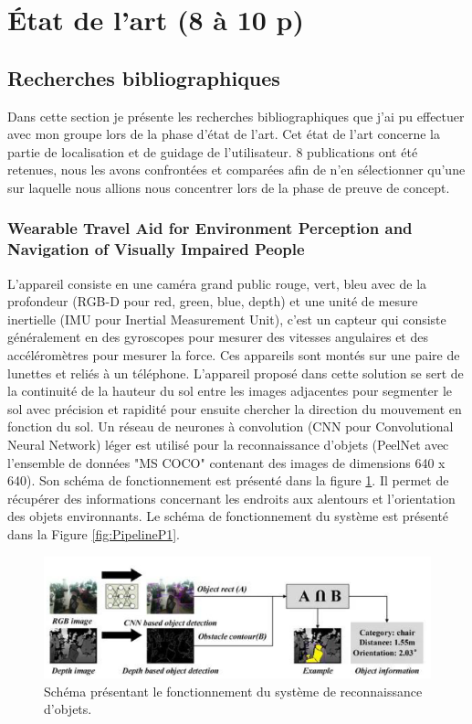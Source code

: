 \documentclass[11pt]{article}
\begin{document}
  \section{État de l'art (8 à 10 p)}  
  \subsection{Recherches bibliographiques}
  Dans cette section je présente les recherches bibliographiques que j'ai pu effectuer avec mon groupe lors de la phase d'état de l'art.
  Cet état de l'art concerne la partie de localisation et de guidage de l'utilisateur. 8 publications ont été retenues, nous les avons 
  confrontées et comparées afin de n'en sélectionner qu'une sur laquelle nous allions nous concentrer lors de la phase de preuve de 
  concept. 

  \subsubsection{Wearable Travel Aid for Environment Perception and Navigation of
  Visually Impaired People}

  L'appareil consiste en une caméra grand public rouge, vert, bleu avec de la profondeur (RGB-D pour red, green, blue, depth)
  et une unité de mesure inertielle (IMU pour Inertial Measurement Unit), c'est un capteur qui consiste généralement en des gyroscopes 
  pour mesurer des vitesses angulaires et des accéléromètres pour mesurer la force. Ces appareils sont montés sur une paire de lunettes
  et reliés à un téléphone. L'appareil proposé dans cette solution se sert de la continuité de la hauteur du sol entre les images 
  adjacentes pour segmenter le sol avec précision et rapidité pour ensuite chercher la direction du mouvement en fonction du sol.
  Un réseau de neurones à convolution (CNN pour Convolutional Neural Network) léger est utilisé pour la reconnaissance d'objets 
  (PeelNet avec l'ensemble de données "MS COCO" contenant des images de dimensions 640 x 640). Son schéma de fonctionnement est présenté 
  dans la figure \ref{fig:ReconnaissanceP1}. Il permet de récupérer des informations concernant les endroits aux alentours et l'orientation 
  des objets environnants. Le schéma de fonctionnement du système est présenté dans la Figure \ref{fig:PipelineP1}.

  \begin{figure}[hbt]  
    \includegraphics[width=\textwidth]{RecognitionP1.png}    
    \caption{Schéma présentant le fonctionnement du système de reconnaissance d'objets.}
    \label{fig:ReconnaissanceP1}
  \end{figure} 
\end{document}
